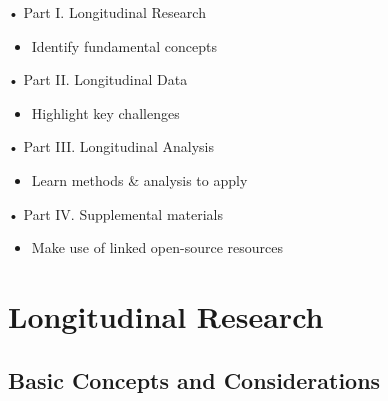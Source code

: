 \documentclass[
  number,
  preprint,
  3p,
  twocolumn]{elsarticle}
\providecommand{\tightlist}{%
  \setlength{\itemsep}{0pt}\setlength{\parskip}{0pt}}\usepackage{longtable,booktabs,array}
\begin{document}
\begin{tcolorbox}[enhanced jigsaw, coltitle=black, colframe=quarto-callout-note-color-frame, arc=.35mm, title={Organization and Aims}, leftrule=.75mm, toprule=.15mm, titlerule=0mm, breakable, toptitle=1mm, colbacktitle=quarto-callout-note-color!10!white, rightrule=.15mm, colback=white, opacityback=0, bottomtitle=1mm, bottomrule=.15mm, left=2mm, opacitybacktitle=0.6]

• Part I. Longitudinal Research

\begin{itemize}
\tightlist
\item
  Identify fundamental concepts
\end{itemize}

• Part II. Longitudinal Data

\begin{itemize}
\tightlist
\item
  Highlight key challenges
\end{itemize}

• Part III. Longitudinal Analysis

\begin{itemize}
\tightlist
\item
  Learn methods \& analysis to apply
\end{itemize}

• Part IV. Supplemental materials

\begin{itemize}
\tightlist
\item
  Make use of linked open-source resources
\end{itemize}

\end{tcolorbox}

\hypertarget{longitudinal-research}{%
\section{Longitudinal Research}\label{longitudinal-research}}

\label{sec:headings}

\hypertarget{basic-concepts-and-considerations}{%
\subsection{Basic Concepts and
Considerations}\label{basic-concepts-and-considerations}}
\end{document}
